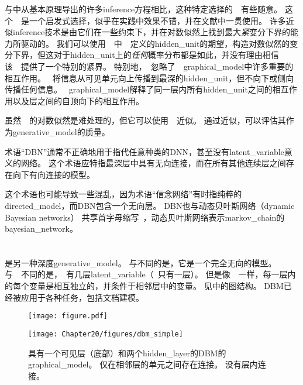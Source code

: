 与中从基本原理导出的许多\gls{inference}方程相比，这种特定选择的~~有些随意。
这个~~是一个启发式选择，似乎在实践中效果不错，并在文献中一贯使用。
许多近似\gls{inference}技术是由它们在一些约束下，并在对数似然上找到最大\emph{紧}变分下界的能力所驱动的。
我们可以使用~~中~~定义的\gls{hidden_unit}的期望，构造对数似然的变分下界，但这对于\gls{hidden_unit}上的\emph{任何}概率分布都是如此，并没有理由相信该~~提供了一个特别的紧界。
特别地，~忽略了~~\gls{graphical_model}中许多重要的相互作用。
~将信息从可见单元向上传播到最深的\gls{hidden_unit}，但不向下或侧向传播任何信息。
~\gls{graphical_model}解释了同一层内所有\gls{hidden_unit}之间的相互作用以及层之间的自顶向下的相互作用。


虽然~~的对数似然是难处理的，但它可以使用~~近似\citep{Salakhutdinov+Murray-2008}。
通过近似，可以评估其作为\gls{generative_model}的质量。


术语``\gls{DBN}''通常不正确地用于指代任意种类的\gls{DNN}，甚至没有\gls{latent_variable}意义的网络。
这个术语应特指最深层中具有无向连接，而在所有其他连续层之间存在向下有向连接的模型。

这个术语也可能导致一些混乱，因为术语``信念网络''有时指纯粹的\gls{directed_model}，而\gls{DBN}包含一个无向层。
\gls{DBN}也与动态贝叶斯网络（dynamic Bayesian networks） \citep{Dean+Kanazawa-1989}共享首字母缩写~，动态贝叶斯网络表示\gls{markov_chain}的\gls{bayesian_network}。


\section{}
\label{sec:deep_boltzmann_machines}

 \citep{SalHinton09}是另一种深度\gls{generative_model}。
与不同的是，它是一个完全无向的模型。
与~~不同的是，~有几层\gls{latent_variable}（~只有一层）。
但是像~~一样，每一层内的每个变量是相互独立的，并条件于相邻层中的变量。
见中的图结构。
\gls{DBM}已经被应用于各种任务，包括文档建模\citep{srivastava2013modeling}。

\begin{figure}[!htb]
\ifOpenSource
\centerline{\texttt{[image: figure.pdf]}}
\else
\centerline{\texttt{[image: Chapter20/figures/dbm\_simple]}}
\fi
\caption{具有一个可见层（底部）和两个\gls{hidden_layer}的\gls{DBM}的\gls{graphical_model}。
仅在相邻层的单元之间存在连接。
没有层内连接。}
\label{fig:chap20_dbm_simple}
\end{figure}

